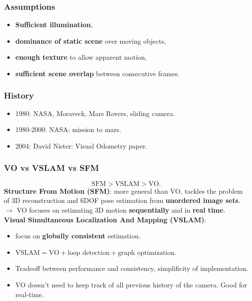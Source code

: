 \documentclass[a4paper,12 pt]{article}
\theoremstyle{definition}
\theoremstyle{remark}
\theoremstyle{definition}
\theoremstyle{definition}
\theoremstyle{definition}
\theoremstyle{remark}
\theoremstyle{definition}
\begin{document}
\subsubsection*{Assumptions}
\begin{itemize}
\item \textbf{Sufficient illumination},
\item \textbf{dominance of static scene} over moving objects,
\item \textbf{enough texture} to allow apparent motion,
\item \textbf{sufficient scene overlap} between consecutive frames.
\end{itemize}
\subsubsection*{History}
\begin{itemize}
\item 1980: NASA, Moraveck, Mars Rovers, sliding camera.
\item 1980-2000: NASA: mission to mars.
\item 2004: David Nister: Visual Odometry paper.
\end{itemize}
\subsubsection*{VO vs VSLAM vs SFM}
\begin{equation*}
\text{SFM}>\text{VSLAM}>\text{VO}.
\end{equation*}
\textbf{Structure From Motion (SFM)}: more general than VO, tackles the problem of 3D reconstruction and 6DOF pose estimation from \textbf{unordered image sets}. \\
$\rightarrow$ VO focuses on estimating 3D motion \textbf{sequentially} and in \textbf{real time}. \\
\textbf{Visual Simultaneous Localization And Mapping (VSLAM)}:
\begin{itemize}
\item focus on \textbf{globally consistent} estimation.
\item $\text{VSLAM}=\text{VO}+\text{loop detection} +\text{graph optimization}$.
\item Tradeoff between performance and consistency, simplificity of implementation.
\item VO doesn't need to keep track of all previous history of the camera. Good for real-time.
\end{itemize}
\end{document}
